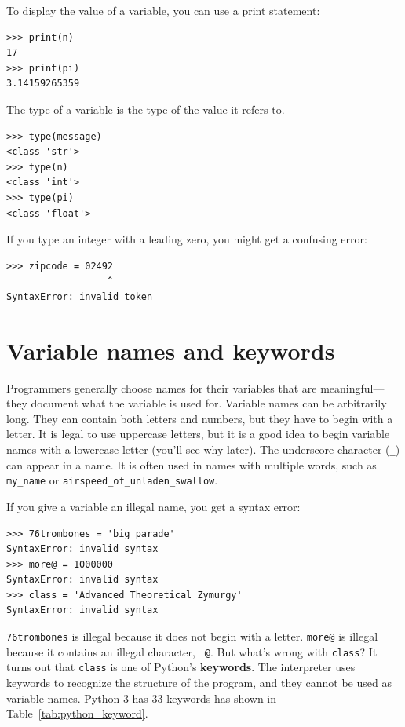 To display the value of a variable, you can use a print statement:

\beforeverb
\begin{verbatim}
>>> print(n)
17
>>> print(pi)
3.14159265359
\end{verbatim}
\afterverb
%
The type of a variable is the type of the value it refers to.

\beforeverb
\begin{verbatim}
>>> type(message)
<class 'str'>
>>> type(n)
<class 'int'>
>>> type(pi)
<class 'float'>
\end{verbatim}
\afterverb
%
\begin{remark}
If you type an integer with a leading zero, you might get
a confusing error:

\beforeverb
\begin{verbatim}
>>> zipcode = 02492
                  ^
SyntaxError: invalid token
\end{verbatim}
\afterverb
\end{remark}




\section{Variable names and keywords}

Programmers generally choose names for their variables that
are meaningful---they document what the variable is used for.
Variable names can be arbitrarily long.  They can contain
both letters and numbers, but they have to begin with a letter.
It is legal to use uppercase letters, but it is a good idea
to begin variable names with a lowercase letter (you'll
see why later).
The underscore character (\verb"_") can appear in a name.
It is often used in names with multiple words, such as
\verb"my_name" or \verb"airspeed_of_unladen_swallow".


If you give a variable an illegal name, you get a syntax error:

\beforeverb
\begin{verbatim}
>>> 76trombones = 'big parade'
SyntaxError: invalid syntax
>>> more@ = 1000000
SyntaxError: invalid syntax
>>> class = 'Advanced Theoretical Zymurgy'
SyntaxError: invalid syntax
\end{verbatim}
\afterverb
%
{\tt 76trombones} is illegal because it does not begin with a letter.
{\tt more@} is illegal because it contains an illegal character, {\tt
@}.  But what's wrong with {\tt class}?
It turns out that {\tt class} is one of Python's {\bf keywords}.  The
interpreter uses keywords to recognize the structure of the program,
and they cannot be used as variable names.
Python 3 has 33 keywords has shown in Table~\ref{tab:python_keyword}.

